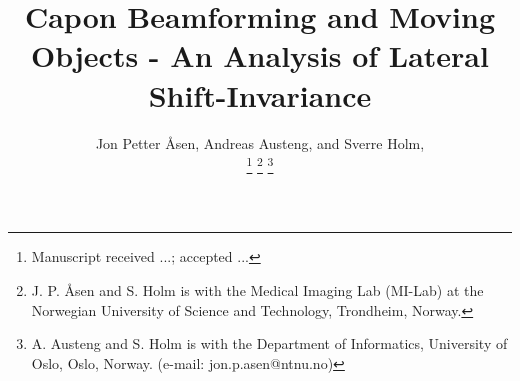 \documentclass[draftcls]{IEEEtran}
\begin{document}
%
\title{Capon Beamforming and Moving Objects - An Analysis of Lateral Shift-Invariance}
%
%
%

\author{
   Jon Petter \AA{}sen,  Andreas Austeng,  and Sverre Holm, %
   
\thanks{Manuscript received ...; accepted ...}
\thanks{J. P. \AA{}sen and S. Holm is with the Medical Imaging Lab (MI-Lab) at the Norwegian University of Science and Technology, Trondheim, Norway.}
\thanks{A. Austeng and S. Holm is with the Department of Informatics, University of Oslo, Oslo, Norway. (e-mail: jon.p.asen@ntnu.no)} 
}

% 
%
\end{document}

